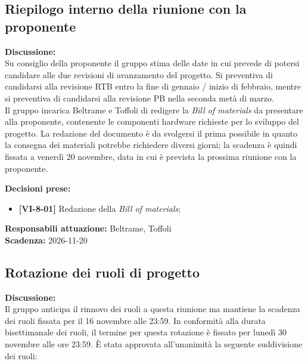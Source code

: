 \documentclass[12pt,a4paper]{article}
\newcommand{\tightlist}{\setlength{\itemsep}{1pt}\setlength{\parskip}{0pt}}
\begin{document}
\hypertarget{odg-1}{%
\subsection{Riepilogo interno della riunione con la proponente}}
\textbf{Discussione:} \\
Su consiglio della proponente il gruppo stima delle date in cui prevede di potersi candidare alle due revisioni di avanzamento del progetto. Si preventiva di candidarsi alla revisione RTB entro la fine di gennaio / inizio di febbraio, mentre si preventiva di candidarsi alla revisione PB nella seconda metà di marzo. \\
Il gruppo incarica Beltrame e Toffoli di redigere la \textit{Bill of materials} da presentare alla proponente, contenente le componenti hardware richieste per lo sviluppo del progetto. La redazione del documento è da svolgersi il prima possibile in quanto la consegna dei materiali potrebbe richiedere diversi giorni; la scadenza è quindi fissata a venerdì 20 novembre, data in cui è prevista la prossima riunione con la proponente.

\textbf{Decisioni prese:}
\begin{itemize}
\tightlist
\item[$\checkmark$] \textbf{[VI-8-01]} Redazione della \textit{Bill of materials};
\end{itemize}

\textbf{Responsabili attuazione:} Beltrame, Toffoli \\
\textbf{Scadenza:} 2026-11-20

\hypertarget{odg-2}{%
\subsection{Rotazione dei ruoli di progetto}}
\textbf{Discussione:} \\
Il gruppo anticipa il rinnovo dei ruoli a questa riunione ma mantiene la scadenza dei ruoli fissata per il 16 novembre alle 23:59. In conformità alla durata bisettimanale dei ruoli, il termine per questa rotazione è fissato per lunedì 30 novembre alle ore 23:59. È stata approvata all'unanimità la seguente suddivisione dei ruoli:
\end{document}
